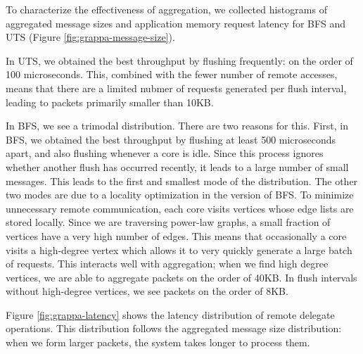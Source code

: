 To characterize the effectiveness of aggregation, we collected
histograms of aggregated message sizes and application memory request
latency for BFS and UTS (Figure \ref{fig:grappa-message-size}).



In UTS, we obtained the best throughput by flushing frequently: on the
order of 100 microseconds. This, combined with the fewer number of remote
accesses, means that there are a limited nubmer of requests generated
per flush interval, leading to packets primarily smaller than 10KB.

In BFS, we see a trimodal distribution. There are two reasons for
this. First, in BFS, we obtained the best throughput by flushing at
least 500 microseconds apart, and also flushing whenever a core is
idle. Since this process ignores whether another flush has occurred
recently, it leads to a large number of small messages. This leads to
the first and smallest mode of the distribution.  The other two modes
are due to a locality optimization in the \Grappa version of BFS. To
minimize unnecessary remote communication, each core visits vertices
whose edge lists are stored locally. Since we are traversing power-law graphs, a small fraction of vertices have a very high number of edges. This means that occasionally a core visits a high-degree vertex which allows it to very quickly generate a large batch of requests. This interacts well with aggregation; when we find high degree vertices, we are able to aggregate packets on the order of 40KB. In flush intervals without high-degree vertices, we see packets on the order of 8KB.

Figure \ref{fig:grappa-latency} shows the latency distribution of
remote delegate operations. This distribution follows the aggregated
message size distribution: when we form larger packets, the system
takes longer to process them.


